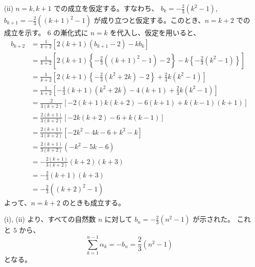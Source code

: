 \documentclass[a4paper,10pt]{ltjsarticle}
\begin{document}
\begin{multicols}{2}
(ii) $n=k, k+1$ での成立を仮定する。すなわち、
$b_k = -\frac{2}{3}(k^2 - 1)$, $b_{k+1} = -\frac{2}{3}((k+1)^2 - 1)$
が成り立つと仮定する。このとき、$n=k+2$ での成立を示す。
${6}$ の漸化式に $n=k$ を代入し、仮定を用いると、
\begin{align*}
b_{k+2} &= \frac{1}{k+2} \left[ 2(k+1)(b_{k+1} - 2) - k b_k \right] \\
&= \frac{1}{k+2} \left[ 2(k+1) \left\{ -\frac{2}{3}((k+1)^2 - 1) - 2 \right\} - k \left\{ -\frac{2}{3}(k^2 - 1) \right\} \right] \\
&= \frac{1}{k+2} \left[ 2(k+1) \left\{ -\frac{2}{3}(k^2+2k) - 2 \right\} + \frac{2}{3}k(k^2 - 1) \right] \\
&= \frac{1}{k+2} \left[ -\frac{4}{3}(k+1)(k^2+2k) - 4(k+1) + \frac{2}{3}k(k^2-1) \right] \\
&= \frac{2}{3(k+2)} \left[ -2(k+1)k(k+2) - 6(k+1) + k(k-1)(k+1) \right] \\
&= \frac{2(k+1)}{3(k+2)} \left[ -2k(k+2) - 6 + k(k-1) \right] \\
&= \frac{2(k+1)}{3(k+2)} \left[ -2k^2 - 4k - 6 + k^2 - k \right] \\
&= \frac{2(k+1)}{3(k+2)} (-k^2 - 5k - 6) \\
&= -\frac{2(k+1)}{3(k+2)} (k+2)(k+3) \\
&= -\frac{2}{3}(k+1)(k+3) \\
&= -\frac{2}{3}((k+2)^2 - 1)
\end{align*}
よって、$n=k+2$ のときも成立する。

\vspace{10pt}

(i), (ii) より、すべての自然数 $n$ に対して $b_n = -\frac{2}{3}(n^2 - 1)$ が示された。
これと ${5}$ から、
$$
\sum_{k=1}^{n-1} \alpha_k = -b_n = \frac{2}{3}(n^2-1)
$$
となる。

     \newpage
\end{multicols}
\end{document}
